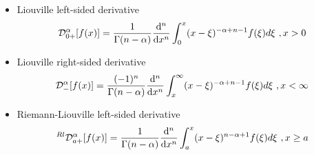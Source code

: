 \documentclass[twoside]{book}
\begin{document}
{\begin{itemize}
    \item Liouville left-sided derivative
          \begin{equation}
              \mathcal{D}^{\alpha}_{0+}[f(x)] = \frac{1}{\Gamma{(n-\alpha)}} \dv[n]{}{x} \int_0^x (x-\xi)^{-\alpha+n-1} f(\xi) d\xi  \,\, , x >0
          \end{equation}
    \item Liouville right-sided derivative
          \begin{equation}
              \mathcal{D}^{\alpha}_{-}[f(x)] = \frac{(-1)^n}{\Gamma{(n-\alpha)}} \dv[n]{}{x} \int_x^\infty (x-\xi)^{-\alpha+n-1} f(\xi) d\xi  \,\, ,  x <\infty
          \end{equation}

    \item Riemann-Liouville left-sided derivative
          \begin{equation}
              ^{Rl}\mathcal{D}^{\alpha}_{a+}[f(x)] = \frac{1}{\Gamma{(n-\alpha)}} \dv[n]{}{x} \int_a^x (x-\xi)^{n-\alpha+1} f(\xi) d\xi  \,\, ,   x \geq a
          \end{equation}


\end{itemize}}
\end{document}
